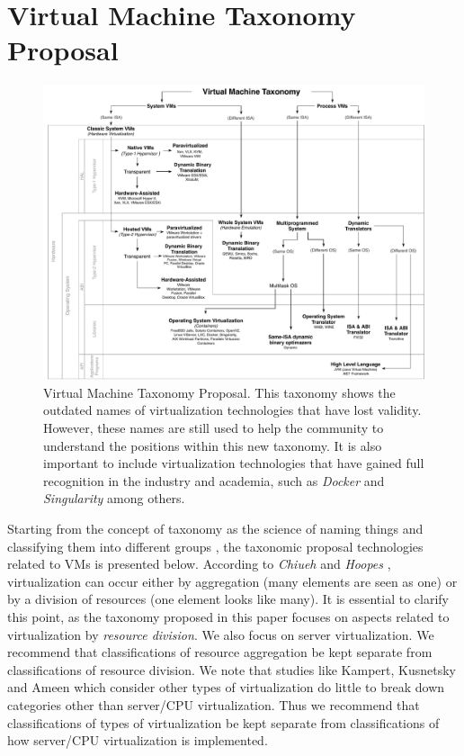 	\section {Virtual Machine Taxonomy Proposal} \label{sec:taxonomiaPropuesta}
	
	\begin{figure}[ht]
		\centering
		\includegraphics[width=17cm]{images/virtualMachineTaxonomy.pdf}
		\vspace{-0.2cm}%
		\caption{Virtual Machine Taxonomy Proposal. This taxonomy shows the outdated names of virtualization technologies that have lost validity. However, these names are still used to help the community to understand the positions within this new taxonomy. It is also important to include virtualization technologies that have gained full recognition in the industry and academia, such as \textit{Docker} and \textit{Singularity} among others. }
    	\label{fig:TaxonomiaPropuesta}
	\end{figure}
	
	Starting from the concept of taxonomy as the science of naming things and classifying them into different groups \cite{CambridgeDictionary2018, Chi2000}, the taxonomic proposal technologies related to VMs is presented below. According to \textit{Chiueh} \cite{Chiueh2005} and \textit{Hoopes} \cite{Hoopes2009}, virtualization can occur either by aggregation (many elements are seen as one) or by a division of resources (one element looks like many). It is essential to clarify this point, as the taxonomy proposed in this paper focuses on aspects related to virtualization by \textit{resource division}. We also focus on server virtualization. We recommend that classifications of resource aggregation be kept separate from classifications of resource division. We note that studies like Kampert, Kusnetsky and Ameen which consider other types of virtualization do little to break down categories other than server/CPU virtualization. Thus we recommend that classifications of types of virtualization be kept separate from classifications of how server/CPU virtualization is implemented.  
	
